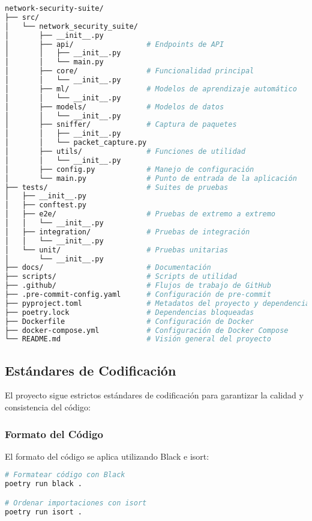 \begin{lstlisting}[language=bash, caption=Estructura del Proyecto]
network-security-suite/
├── src/
│   └── network_security_suite/
│       ├── __init__.py
│       ├── api/                 # Endpoints de API
│       │   ├── __init__.py
│       │   └── main.py
│       ├── core/                # Funcionalidad principal
│       │   └── __init__.py
│       ├── ml/                  # Modelos de aprendizaje automático
│       │   └── __init__.py
│       ├── models/              # Modelos de datos
│       │   └── __init__.py
│       ├── sniffer/             # Captura de paquetes
│       │   ├── __init__.py
│       │   └── packet_capture.py
│       ├── utils/               # Funciones de utilidad
│       │   └── __init__.py
│       ├── config.py            # Manejo de configuración
│       └── main.py              # Punto de entrada de la aplicación
├── tests/                       # Suites de pruebas
│   ├── __init__.py
│   ├── conftest.py
│   ├── e2e/                     # Pruebas de extremo a extremo
│   │   └── __init__.py
│   ├── integration/             # Pruebas de integración
│   │   └── __init__.py
│   └── unit/                    # Pruebas unitarias
│       └── __init__.py
├── docs/                        # Documentación
├── scripts/                     # Scripts de utilidad
├── .github/                     # Flujos de trabajo de GitHub
├── .pre-commit-config.yaml      # Configuración de pre-commit
├── pyproject.toml               # Metadatos del proyecto y dependencias
├── poetry.lock                  # Dependencias bloqueadas
├── Dockerfile                   # Configuración de Docker
├── docker-compose.yml           # Configuración de Docker Compose
└── README.md                    # Visión general del proyecto
\end{lstlisting}

\subsection{Estándares de Codificación}
El proyecto sigue estrictos estándares de codificación para garantizar la calidad y consistencia del código:

\subsubsection{Formato del Código}
El formato del código se aplica utilizando Black e isort:

\begin{lstlisting}[language=bash, caption=Formato del Código]
# Formatear código con Black
poetry run black .

# Ordenar importaciones con isort
poetry run isort .
\end{lstlisting}

